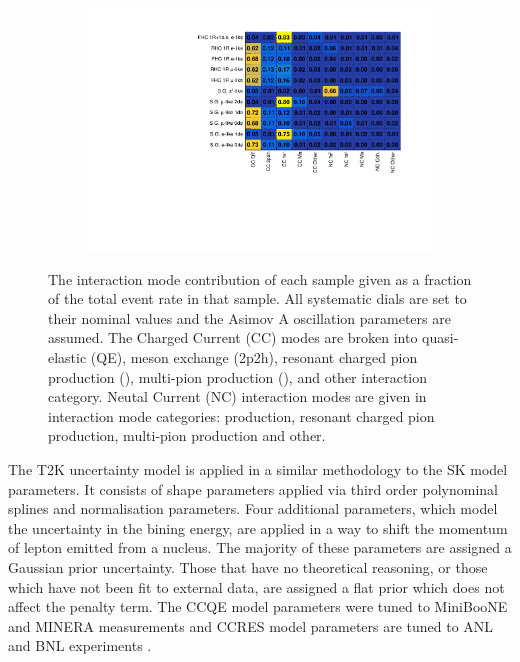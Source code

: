 \begin{figure}[h]
  \begin{subfigure}[t]{\textwidth}
    \includegraphics[width=\textwidth, trim={0mm 0mm 0mm 0mm}, clip,page=1]{Figures/Selections/FractionalModeComparison.pdf}
  \end{subfigure}
  \caption{The interaction mode contribution of each sample given as a fraction of the total event rate in that sample. All systematic dials are set to their nominal values and the Asimov A oscillation parameters are assumed. The Charged Current (CC) modes are broken into quasi-elastic (QE), meson exchange (2p2h), resonant charged pion production (\quickmath{1\pi^{\pm}}), multi-pion production (), and other interaction category. Neutal Current (NC) interaction modes are given in interaction mode categories:  production, resonant charged pion production,  multi-pion production and other.}
  \label{fig:SelsAndSysts_FractionalModeComparison}
\end{figure}

The T2K uncertainty model is applied in a similar methodology to the SK model parameters. It consists of  shape parameters applied via third order polynominal splines and  normalisation parameters. Four additional parameters, which model the uncertainty in the bining energy, are applied in a way to shift the momentum of lepton emitted from a nucleus. The majority of these parameters are assigned a Gaussian prior uncertainty. Those that have no theoretical reasoning, or those which have not been fit to external data, are assigned a flat prior which does not affect the penalty term. The CCQE model parameters were tuned to MiniBooNE \cite{miniboone_nu_ccqe} and MINER\quickmath{\nu}A \cite{minerva_nubar_ccqe} measurements and CCRES model parameters are tuned to ANL and BNL experiments \cite{ANL_BNL_corr}.

